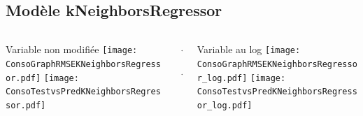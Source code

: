 \documentclass[8pt,aspectratio=169,hyperref={unicode=true}]{beamer}
\begin{document}
\subsection{Modèle kNeighborsRegressor}
\begin{frame}{\insertsubsection}
  \begin{columns}[t]
    \begin{column}{.33\textwidth}
      \centering Variable non modifiée
      \texttt{[image: ConsoGraphRMSEKNeighborsRegressor.pdf]}
      \texttt{[image: ConsoTestvsPredKNeighborsRegressor.pdf]}
    \end{column}
    \begin{column}{.33\textwidth}
      $\Longleftarrow$
      \scriptsize
      {\centering
        }
      

      \normalsize
      $\Longleftarrow$

      \raggedleft{$\Longrightarrow$}
      \scriptsize
      {\centering
        }
      

      \normalsize
      \raggedleft{$\Longrightarrow$}
    \end{column}
    \begin{column}{.33\textwidth}
      \centering Variable au log
      \texttt{[image: ConsoGraphRMSEKNeighborsRegressor\_log.pdf]}
      \texttt{[image: ConsoTestvsPredKNeighborsRegressor\_log.pdf]}
    \end{column}
  \end{columns}
\end{frame}
\end{document}
